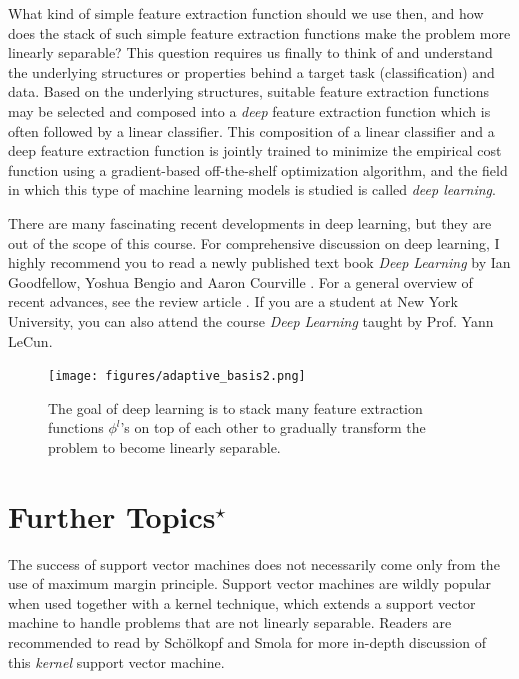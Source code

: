 \documentclass{report}
\begin{document}
What kind of simple feature extraction function should we use then, and how does
the stack of such simple feature extraction functions make the problem more
linearly separable? This question requires us finally to think of and understand
the underlying structures or properties behind a target task (classification)
and data. Based on the underlying structures, suitable feature extraction
functions may be selected and composed into a {\it deep} feature extraction
function which is often followed by a linear classifier. This composition of a
linear classifier and a deep feature extraction function is jointly trained to
minimize the empirical cost function using a gradient-based off-the-shelf
optimization algorithm, and the field in which this type of machine learning
models is studied is called {\it deep learning}. 

There are many fascinating recent developments in deep learning, but they are
out of the scope of this course. For comprehensive discussion on deep learning,
I highly recommend you to read a newly published text book {\it Deep Learning}
by Ian Goodfellow, Yoshua Bengio and Aaron Courville \cite{goodfellow2016deep}.
For a general overview of recent advances, see the review article
\cite{lecun2015deep}. If you are a student at New York University, you can also
attend the course {\it Deep Learning} taught by Prof. Yann LeCun.



\begin{figure}
    \centering
    \begin{minipage}{0.6\textwidth}
        \centering
        \texttt{[image: figures/adaptive\_basis2.png]}
    \end{minipage}
    \begin{minipage}{0.39\textwidth}
        \caption{
            \label{fig:feature_extraction_deep}
            The goal of deep learning is to stack many feature extraction
            functions $\phi^l$'s on top of each other to gradually transform the
            problem to become linearly separable. 
        }
    \end{minipage}
\end{figure}

\section{Further Topics$^\star$}

The success of support vector machines does not necessarily come only from the
use of maximum margin principle. Support vector machines are wildly popular when
used together with a kernel technique, which extends a support vector machine to
handle problems that are not linearly separable. Readers are recommended to read
\cite{scholkopf2002learning} by Sch{\"o}lkopf and Smola for more in-depth
discussion of this {\it kernel} support vector machine.
\end{document}
